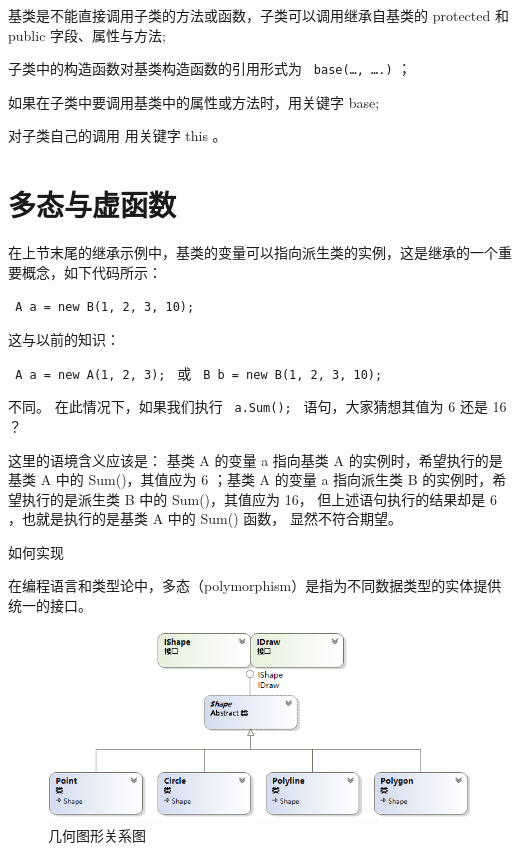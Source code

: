  基类是不能直接调用子类的方法或函数，子类可以调用继承自基类的 protected 和 public 字段、属性与方法;
 
 子类中的构造函数对基类构造函数的引用形式为 \verb| base(…, ….)| ；
 
 如果在子类中要调用基类中的属性或方法时，用关键字 base;
 
 对子类自己的调用 用关键字 this 。
 



\section{多态与虚函数}

在上节末尾的继承示例中，基类的变量可以指向派生类的实例，这是继承的一个重要概念，如下代码所示：

\verb| A a = new B(1, 2, 3, 10); |

这与以前的知识： 

\verb| A a = new A(1, 2, 3); | 或 \verb| B b = new B(1, 2, 3, 10); |

不同。 在此情况下，如果我们执行 \verb| a.Sum(); | 语句，大家猜想其值为 6 还是 16 ？

这里的语境含义应该是： 基类 A 的变量 a 指向基类 A 的实例时，希望执行的是基类 A 中的 Sum()，其值应为 6 ；基类 A 的变量 a 指向派生类 B 的实例时，希望执行的是派生类 B 中的 Sum()，其值应为 16， 但上述语句执行的结果却是 6 ，也就是执行的是基类 A 中的 Sum() 函数， 显然不符合期望。


如何实现



在编程语言和类型论中，多态（polymorphism）是指为不同数据类型的实体提供统一的接口。

\begin{figure}[htbp]
	\centering
	\includegraphics[scale=0.8]{chapter/csobject/graph.png}
	\caption{几何图形关系图}
	\label{fig:graph}
\end{figure}




